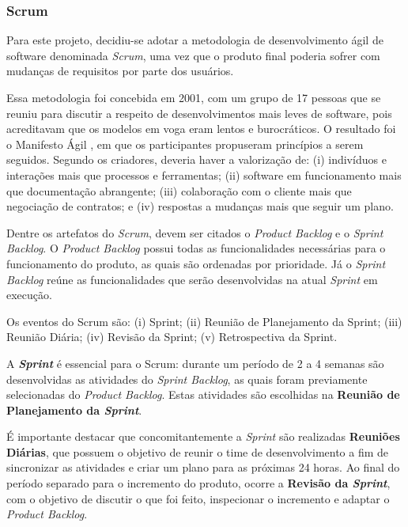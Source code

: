 
\subsubsection{Scrum} 
Para este projeto, decidiu-se adotar a metodologia de desenvolvimento ágil de software denominada \textit{Scrum}, uma vez que o produto final poderia sofrer com mudanças de requisitos por parte dos usuários. 

Essa metodologia foi concebida em 2001, com um grupo de 17 pessoas que se reuniu para discutir a respeito de desenvolvimentos mais leves de software, pois acreditavam que os modelos em voga eram lentos e burocráticos. O resultado foi o Manifesto Ágil \citep{agileManifesto}, em que os participantes propuseram princípios a serem seguidos. Segundo os criadores, deveria haver a valorização de: (i) indivíduos e interações mais que processos e ferramentas; (ii) software em funcionamento mais que documentação abrangente; (iii) colaboração com o cliente mais que negociação de contratos; e (iv) respostas a mudanças mais que seguir um plano.

Dentre os artefatos do \textit{Scrum}, devem ser citados o \textit{Product Backlog} e o \textit{Sprint Backlog}. O \textit{Product Backlog} possui todas as funcionalidades necessárias para o funcionamento do produto, as quais são ordenadas por prioridade. Já o \textit{Sprint Backlog} reúne as funcionalidades que serão desenvolvidas na atual \textit{Sprint} em execução.

Os eventos do Scrum são: (i) Sprint; (ii) Reunião de Planejamento da Sprint; (iii) Reunião Diária; (iv) Revisão da Sprint; (v) Retrospectiva da Sprint.

A \textbf{\textit{Sprint}} é essencial para o Scrum: durante um período de 2 a 4 semanas são desenvolvidas as atividades do \textit{Sprint Backlog}, as quais foram previamente selecionadas do \textit{Product Backlog}. Estas atividades são escolhidas na \textbf{Reunião de Planejamento da \textit{Sprint}}. 

É importante destacar que concomitantemente a \textit{Sprint} são realizadas \textbf{Reuniões Diárias}, que possuem o objetivo de reunir o time de desenvolvimento a fim de sincronizar as atividades e criar um plano para as próximas 24 horas. Ao final do período separado para o incremento do produto, ocorre a \textbf{Revisão da \textit{Sprint}}, com o objetivo de discutir o que foi feito, inspecionar o incremento e adaptar o \textit{Product Backlog}. 

